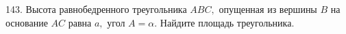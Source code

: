 143. Высота равнобедренного треугольника $ABC,$ опущенная из вершины $B$ на основание $AC$ равна $a,$ угол $A=\alpha.$ Найдите площадь треугольника.\\
